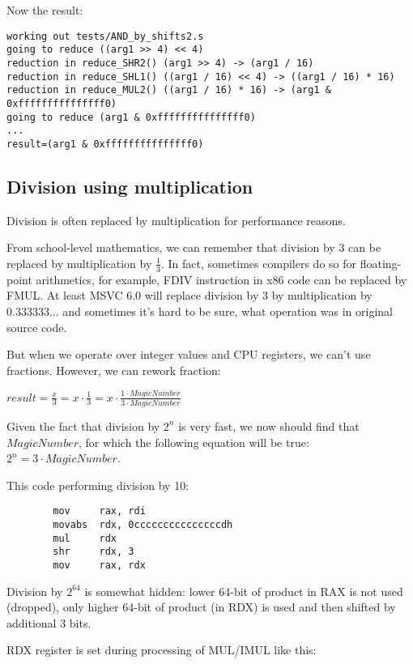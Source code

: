 ﻿\documentclass[12pt]{article}
\begin{document}
Now the result:

\begin{lstlisting}
working out tests/AND_by_shifts2.s
going to reduce ((arg1 >> 4) << 4)
reduction in reduce_SHR2() (arg1 >> 4) -> (arg1 / 16)
reduction in reduce_SHL1() ((arg1 / 16) << 4) -> ((arg1 / 16) * 16)
reduction in reduce_MUL2() ((arg1 / 16) * 16) -> (arg1 & 0xfffffffffffffff0)
going to reduce (arg1 & 0xfffffffffffffff0)
...
result=(arg1 & 0xfffffffffffffff0)
\end{lstlisting}

\subsection{Division using multiplication}

Division is often replaced by multiplication for performance reasons.

From school-level mathematics, we can remember that division by 3 can be replaced by multiplication by $\frac{1}{3}$.
In fact, sometimes compilers do so for floating-point arithmetics, for example, FDIV instruction in x86 code
can be replaced by FMUL.
At least MSVC 6.0 will replace division by 3 by multiplication by $0.333333...$ and sometimes it's hard to be sure,
what operation was in original source code.

But when we operate over integer values and CPU registers, we can't use fractions.
However, we can rework fraction:

\begin{center}
{\large $result = \frac{x}{3} = x \cdot \frac{1}{3} = x \cdot \frac{1 \cdot MagicNumber}{3 \cdot MagicNumber}$}
\end{center}

Given the fact that division by $2^n$ is very fast, we now should find that $MagicNumber$, for which the following
equation will be true: $2^n = 3 \cdot MagicNumber$.

This code performing division by 10:

\begin{lstlisting}
        mov     rax, rdi
        movabs  rdx, 0cccccccccccccccdh
        mul     rdx
        shr     rdx, 3
        mov     rax, rdx
\end{lstlisting}

Division by $2^{64}$ is somewhat hidden: lower 64-bit of product in RAX is not used (dropped), only higher 64-bit of
product (in RDX) is used and then shifted by additional 3 bits.

RDX register is set during processing of MUL/IMUL like this:
\end{document}
